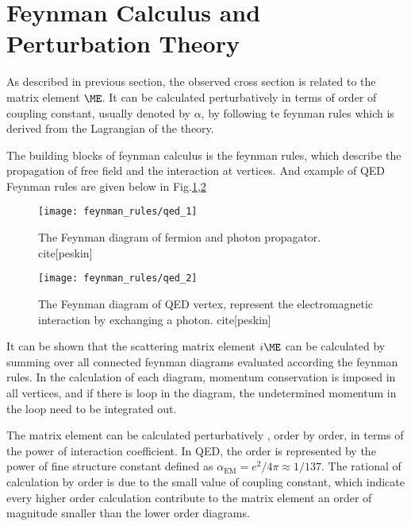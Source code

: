 \section{Feynman Calculus and Perturbation Theory}
 As described in previous section, the observed cross section is related to the matrix element $\ME$. It can be calculated perturbatively in terms of order of coupling constant, usually denoted by $\alpha$, by following te feynman rules which is derived from the Lagrangian of the theory.
 
 The building blocks of feynman calculus is the feynman rules, which describe the propagation of free field and the interaction at vertices. And example of QED Feynman rules are given below in Fig.\ref{fig:QED_1},\ref{fig:QED_2}
 
 \begin{figure}[hbt]
 	\begin{center}
 		\texttt{[image: feynman\_rules/qed\_1]}
 		\caption{\small The Feynman diagram of fermion and photon propagator. cite[peskin]}
 		\label{fig:QED_1}
 	\end{center}
 \end{figure}

 \begin{figure}[hbt]
	\begin{center}
		\texttt{[image: feynman\_rules/qed\_2]}
		\caption{\small The Feynman diagram of QED vertex, represent the electromagnetic interaction by exchanging a photon. cite[peskin]}
		\label{fig:QED_2}
	\end{center}
\end{figure}
 
It can be shown that the scattering matrix element $i\ME$ can be calculated by summing over all connected feynman diagrams evaluated according the feynman rules. In the calculation of each diagram, momentum conservation is imposed in all vertices, and if there is loop in the diagram, the undetermined momentum in the loop need to be integrated out. 

The matrix element can be calculated perturbatively , order by order, in terms of the power of interaction coefficient. In QED, the order is represented by the power of fine structure constant defined as $\alpha_{\mathrm{EM}} = e^2/4\pi\approx 1/137$. The rational of calculation by order is due to the small value of  coupling constant, which indicate every higher order calculation contribute to the matrix element an order of magnitude smaller than the lower order diagrams.

